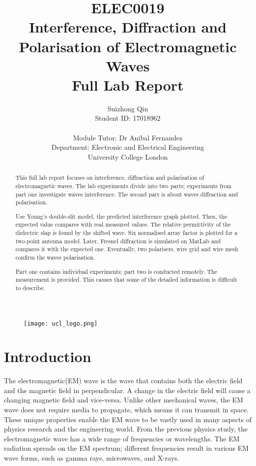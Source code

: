 \documentclass[12pt]{article}
\title{ELEC0019 \\Interference, Diffraction and Polarisation
of Electromagnetic Waves\\Full Lab Report}
\author{Suizhong Qin \\Student ID: 17018962 \\\\ Module Tutor: Dr Anibal Fernandez \\Department: Electronic and Electrical Engineering \\ University College London}
\begin{document}
    \begin{figure}[t] %
    \centering
    \texttt{[image: ucl\_logo.png]}
    \end{figure}
    \maketitle
    \thispagestyle{empty}
    
    \newpage
    \begin{abstract}
    
    This full lab report focuses on interference, diffraction and polarisation of electromagnetic waves. The lab experiments divide into two parts; experiments from part one investigate waves interference. The second part is about waves diffraction and polarisation.
    
    Use Young's double-slit model, the predicted interference graph plotted. Then, the expected value compares with real measured values. The relative permittivity of the dielectric slap is found by the shifted wave. Six normalised array factor is plotted for a two-point antenna model. Later, Fresnel diffraction is simulated on MatLab and compares it with the expected one. Eventually, two polarisers, wire grid and wire mesh confirm the waves polarisation.
    
    Part one contains individual experiments; part two is conducted remotely. The measurement is provided. This causes that some of the detailed information is difficult to describe.
    
    \end{abstract}
    \thispagestyle{empty}
    
    \newpage
    \tableofcontents
    \thispagestyle{empty}
    \setcounter{page}{0}
    
    \newpage
    \pagestyle{plain}
    \section{Introduction}
    \paragraph{}
    The electromagnetic(EM) wave is the wave that contains both the electric field and the magnetic field in perpendicular. A change in the electric field will cause a changing magnetic field and vice-versa\cite{1}. Unlike other mechanical waves, the EM wave does not require media to propagate, which means it can transmit in space. These unique properties enable the EM wave to be vastly used in many aspects of physics research and the engineering world. From the previous physics study, the electromagnetic wave has a wide range of frequencies or wavelengths. The EM radiation spreads on the EM spectrum; different frequencies result in various EM wave forms, such as gamma rays, microwaves, and X-rays. 
    
\end{document}
